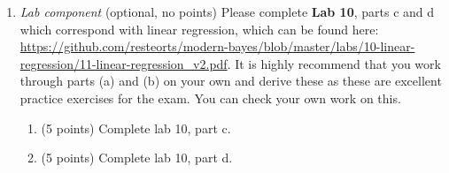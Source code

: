 \documentclass{article}
\begin{document}
\begin{enumerate}
\item \emph{Lab component} (optional, no points) Please complete \textbf{Lab 10}, parts c and d which correspond with linear regression, which can be found here: \url{https://github.com/resteorts/modern-bayes/blob/master/labs/10-linear-regression/11-linear-regression_v2.pdf}.
It is highly recommend that you work through parts (a) and (b) on your own and derive these as these are excellent practice exercises for the exam. You can check your own work on this. 
\begin{enumerate}
\item[c)] (5 points) Complete lab 10, part c.
\item[d)] (5 points) Complete lab 10, part d.
\end{enumerate}


\end{enumerate}
\end{document}
